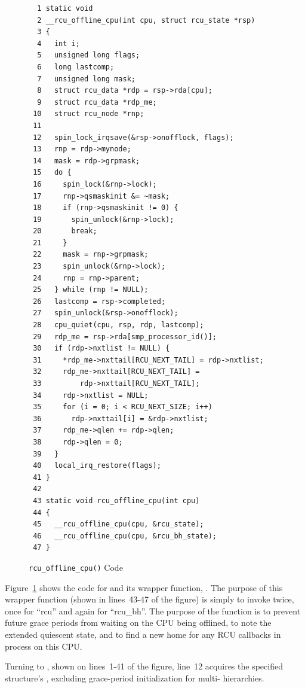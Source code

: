 \begin{figure}[tbp]
{ \scriptsize
\begin{verbatim}
  1 static void
  2 __rcu_offline_cpu(int cpu, struct rcu_state *rsp)
  3 {
  4   int i;
  5   unsigned long flags;
  6   long lastcomp;
  7   unsigned long mask;
  8   struct rcu_data *rdp = rsp->rda[cpu];
  9   struct rcu_data *rdp_me;
 10   struct rcu_node *rnp;
 11
 12   spin_lock_irqsave(&rsp->onofflock, flags);
 13   rnp = rdp->mynode;
 14   mask = rdp->grpmask;
 15   do {
 16     spin_lock(&rnp->lock);
 17     rnp->qsmaskinit &= ~mask;
 18     if (rnp->qsmaskinit != 0) {
 19       spin_unlock(&rnp->lock);
 20       break;
 21     }
 22     mask = rnp->grpmask;
 23     spin_unlock(&rnp->lock);
 24     rnp = rnp->parent;
 25   } while (rnp != NULL);
 26   lastcomp = rsp->completed;
 27   spin_unlock(&rsp->onofflock);
 28   cpu_quiet(cpu, rsp, rdp, lastcomp);
 29   rdp_me = rsp->rda[smp_processor_id()];
 30   if (rdp->nxtlist != NULL) {
 31     *rdp_me->nxttail[RCU_NEXT_TAIL] = rdp->nxtlist;
 32     rdp_me->nxttail[RCU_NEXT_TAIL] =
 33         rdp->nxttail[RCU_NEXT_TAIL];
 34     rdp->nxtlist = NULL;
 35     for (i = 0; i < RCU_NEXT_SIZE; i++)
 36       rdp->nxttail[i] = &rdp->nxtlist;
 37     rdp_me->qlen += rdp->qlen;
 38     rdp->qlen = 0;
 39   }
 40   local_irq_restore(flags);
 41 }
 42
 43 static void rcu_offline_cpu(int cpu)
 44 {
 45   __rcu_offline_cpu(cpu, &rcu_state);
 46   __rcu_offline_cpu(cpu, &rcu_bh_state);
 47 }
\end{verbatim}
}
\caption{{\tt rcu\_offline\_cpu()} Code}
\label{fig:app:rcuimpl:rcutreewt:Code for rcu-offline-cpu}
\end{figure}

Figure~\ref{fig:app:rcuimpl:rcutreewt:Code for rcu-offline-cpu}
shows the code for  and its wrapper
function, .
The purpose of this wrapper function (shown in lines~43-47 of the figure)
is simply to invoke  twice, once for ``rcu'' and
again for ``rcu\_bh''.
The purpose of the  function is to
prevent future grace periods from waiting on the CPU being offlined,
to note the extended quiescent state, and to find a new home for
any RCU callbacks in process on this CPU.

Turning to , shown on lines~1-41 of the figure,
line~12 acquires the specified  structure's
, excluding grace-period initialization for
multi- hierarchies.

